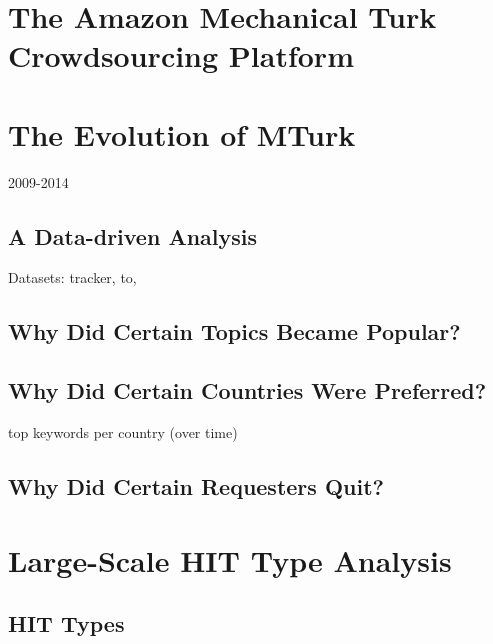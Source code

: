 \documentclass{sig-alternate}
\begin{document}





\section{The Amazon Mechanical Turk Crowdsourcing Platform}

\section{The Evolution of MTurk}
2009-2014
\subsection{A Data-driven Analysis}
Datasets: tracker, to, 
\subsection{Why Did Certain Topics Became Popular?}
\subsection{Why Did Certain Countries Were Preferred?}
top keywords per country (over time)
\subsection{Why Did Certain Requesters Quit?}

\section{Large-Scale HIT Type Analysis}

\subsection{HIT Types}
\end{document}
